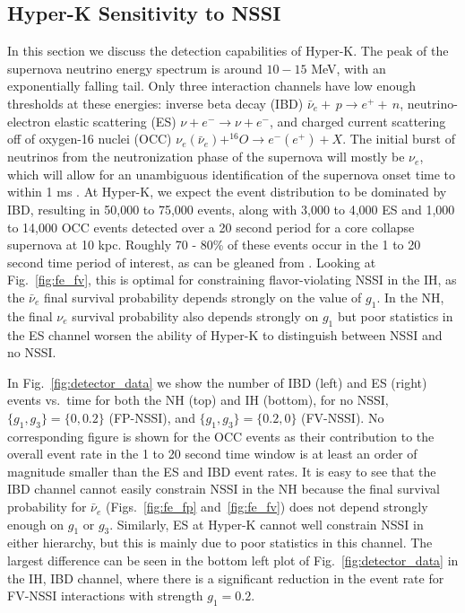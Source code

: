 \documentclass[a4paper,12pt]{article}
\begin{document}
\subsection{Hyper-K Sensitivity to NSSI}
In this section we discuss the detection capabilities of Hyper-K. The peak of the supernova neutrino energy spectrum is around  $10-15$ MeV, with an exponentially falling tail. Only three interaction channels have low enough thresholds at these energies: inverse beta decay (IBD) $\bar{\nu}_{e} +\,p \rightarrow e^{+} +\,n$, neutrino-electron elastic scattering (ES) $\nu + e^{-} \rightarrow \nu + e^{-}$, and charged current scattering off of oxygen-16 nuclei (OCC) $\nu_{e}(\bar{\nu}_{e}) + ^{16}O \rightarrow e^{-}(e^{+}) + X$. The initial burst of neutrinos from the neutronization phase of the supernova will mostly be $\nu_{e}$, which will allow for an unambiguous identification of the supernova onset time to within 1 ms \cite{Abe:2018uyc}. At Hyper-K, we expect the event distribution to be dominated by IBD, resulting in 50,000 to 75,000 events, along with 3,000 to 4,000 ES and 1,000 to 14,000 OCC events detected over a 20 second period for a core collapse supernova at 10 kpc. Roughly 70 - 80\% of these events occur in the 1 to 20 second time period of interest, as can be gleaned from \cite{Abe:2018uyc}. Looking at Fig.~\ref{fig:fe_fv}, this is optimal for constraining flavor-violating NSSI in the IH, as the $\bar{\nu}_{e}$ final survival probability depends strongly on the value of $g_{1}$. In the NH, the final $\nu_{e}$ survival probability also depends strongly on $g_{1}$ but poor statistics in the ES channel worsen the ability of Hyper-K to distinguish between NSSI and no NSSI.

In Fig.~\ref{fig:detector_data} we show the number of IBD (left) and ES (right) events vs.\ time for both the NH (top) and IH (bottom), for no NSSI, $\{g_{1}, g_{3}\} = \{0, 0.2\}$ (FP-NSSI), and $\{g_{1}, g_{3}\} = \{0.2, 0\}$ (FV-NSSI). No corresponding figure is shown for the OCC events as their contribution to the overall event rate in the 1 to 20 second time window is at least an order of magnitude smaller than the ES and IBD event rates. It is easy to see that the IBD channel cannot easily constrain NSSI in the NH because the final survival probability for $\bar{\nu}_{e}$ (Figs.~\ref{fig:fe_fp} and~\ref{fig:fe_fv}) does not depend strongly enough on $g_{1}$ or $g_{3}$. Similarly, ES at Hyper-K cannot well constrain NSSI in either hierarchy, but this is mainly due to poor statistics in this channel. The largest difference can be seen in the bottom left plot of Fig.~\ref{fig:detector_data} in the IH, IBD channel, where there is a significant reduction in the event rate for FV-NSSI interactions with strength $g_{1} = 0.2$.
\end{document}
